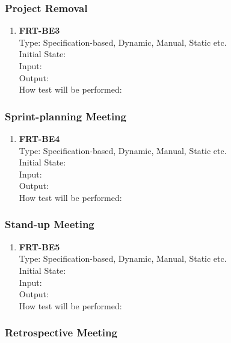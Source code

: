 \documentclass[12pt, titlepage]{article}
\begin{document}
\subsubsection{Project Removal}

\begin{enumerate}
    \item{\textbf{FRT-BE3}}\\
    Type: Specification-based, Dynamic, Manual, Static etc.\\
    Initial State: \\
    Input: \\
    Output: \\
    How test will be performed: \\
\end{enumerate}

\subsubsection{Sprint-planning Meeting}

\begin{enumerate}
    \item{\textbf{FRT-BE4}}\\
    Type: Specification-based, Dynamic, Manual, Static etc.\\
    Initial State: \\
    Input: \\
    Output: \\
    How test will be performed: \\
\end{enumerate}

\subsubsection{Stand-up Meeting}

\begin{enumerate}
    \item{\textbf{FRT-BE5}}\\
    Type: Specification-based, Dynamic, Manual, Static etc.\\
    Initial State: \\
    Input: \\
    Output: \\
    How test will be performed: \\
\end{enumerate}

\subsubsection{Retrospective Meeting}
\end{document}
